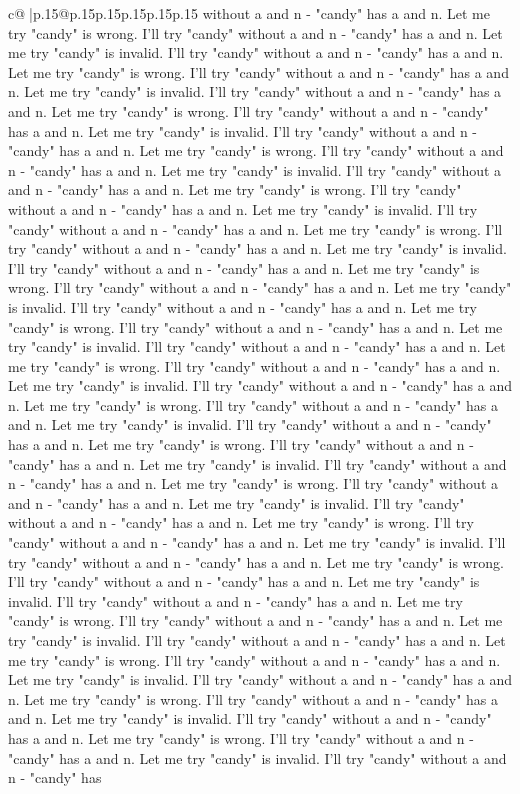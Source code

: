 \documentclass{article}
\begin{document}
{\begin{supertabular}{c@{$\;$}|p{.15\linewidth}@{}p{.15\linewidth}p{.15\linewidth}p{.15\linewidth}p{.15\linewidth}p{.15\linewidth}}
{{{without a and n {-} "candy" has a and n. Let me try "candy" is wrong. I'll try "candy" without a and n {-} "candy" has a and n. Let me try "candy" is invalid. I'll try "candy" without a and n {-} "candy" has a and n. Let me try "candy" is wrong. I'll try "candy" without a and n {-} "candy" has a and n. Let me try "candy" is invalid. I'll try "candy" without a and n {-} "candy" has a and n. Let me try "candy" is wrong. I'll try "candy" without a and n {-} "candy" has a and n. Let me try "candy" is invalid. I'll try "candy" without a and n {-} "candy" has a and n. Let me try "candy" is wrong. I'll try "candy" without a and n {-} "candy" has a and n. Let me try "candy" is invalid. I'll try "candy" without a and n {-} "candy" has a and n. Let me try "candy" is wrong. I'll try "candy" without a and n {-} "candy" has a and n. Let me try "candy" is invalid. I'll try "candy" without a and n {-} "candy" has a and n. Let me try "candy" is wrong. I'll try "candy" without a and n {-} "candy" has a and n. Let me try "candy" is invalid. I'll try "candy" without a and n {-} "candy" has a and n. Let me try "candy" is wrong. I'll try "candy" without a and n {-} "candy" has a and n. Let me try "candy" is invalid. I'll try "candy" without a and n {-} "candy" has a and n. Let me try "candy" is wrong. I'll try "candy" without a and n {-} "candy" has a and n. Let me try "candy" is invalid. I'll try "candy" without a and n {-} "candy" has a and n. Let me try "candy" is wrong. I'll try "candy" without a and n {-} "candy" has a and n. Let me try "candy" is invalid. I'll try "candy" without a and n {-} "candy" has a and n. Let me try "candy" is wrong. I'll try "candy" without a and n {-} "candy" has a and n. Let me try "candy" is invalid. I'll try "candy" without a and n {-} "candy" has a and n. Let me try "candy" is wrong. I'll try "candy" without a and n {-} "candy" has a and n. Let me try "candy" is invalid. I'll try "candy" without a and n {-} "candy" has a and n. Let me try "candy" is wrong. I'll try "candy" without a and n {-} "candy" has a and n. Let me try "candy" is invalid. I'll try "candy" without a and n {-} "candy" has a and n. Let me try "candy" is wrong. I'll try "candy" without a and n {-} "candy" has a and n. Let me try "candy" is invalid. I'll try "candy" without a and n {-} "candy" has a and n. Let me try "candy" is wrong. I'll try "candy" without a and n {-} "candy" has a and n. Let me try "candy" is invalid. I'll try "candy" without a and n {-} "candy" has a and n. Let me try "candy" is wrong. I'll try "candy" without a and n {-} "candy" has a and n. Let me try "candy" is invalid. I'll try "candy" without a and n {-} "candy" has a and n. Let me try "candy" is wrong. I'll try "candy" without a and n {-} "candy" has a and n. Let me try "candy" is invalid. I'll try "candy" without a and n {-} "candy" has a and n. Let me try "candy" is wrong. I'll try "candy" without a and n {-} "candy" has a and n. Let me try "candy" is invalid. I'll try "candy" without a and n {-} "candy" has a and n. Let me try "candy" is wrong. I'll try "candy" without a and n {-} "candy" has a and n. Let me try "candy" is invalid. I'll try "candy" without a and n {-} "candy" has }}}
\end{supertabular}}
\end{document}
